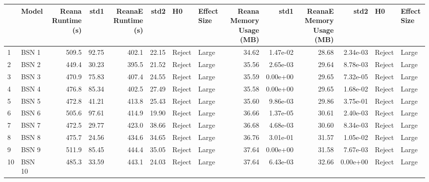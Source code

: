 \begin{tabular}{llrrrrllrrrrll}
\toprule
{} &   Model &  Reana Runtime (s) &    std1 &  ReanaE Runtime (s) &    std2 &          H0 & Effect Size &  Reana Memory Usage (MB) &      std1 &  ReanaE Memory Usage (MB) &      std2 &      H0 & Effect Size \\
\midrule
1  &   BSN 1 &              509.5 &   92.75 &               402.1 &   22.15 &      Reject &       Large &                    34.62 &  1.47e-02 &                     28.68 &  2.34e-03 &  Reject &       Large \\
2  &   BSN 2 &              449.4 &   30.23 &               395.5 &   21.52 &      Reject &       Large &                    35.56 &  2.65e-03 &                     29.64 &  8.78e-03 &  Reject &       Large \\
3  &   BSN 3 &              470.9 &   75.83 &               407.4 &   24.55 &      Reject &       Large &                    35.59 &  0.00e+00 &                     29.65 &  7.32e-05 &  Reject &       Large \\
4  &   BSN 4 &              476.8 &   85.34 &               402.5 &   27.49 &      Reject &       Large &                    35.58 &  0.00e+00 &                     29.65 &  1.68e-02 &  Reject &       Large \\
5  &   BSN 5 &              472.8 &   41.21 &               413.8 &   25.43 &      Reject &       Large &                    35.60 &  9.86e-03 &                     29.86 &  3.75e-01 &  Reject &       Large \\
6  &   BSN 6 &              505.6 &   97.61 &               414.9 &   19.90 &      Reject &       Large &                    36.66 &  1.37e-05 &                     30.61 &  2.40e-03 &  Reject &       Large \\
7  &   BSN 7 &              472.5 &   29.77 &               423.0 &   38.66 &      Reject &       Large &                    36.68 &  4.68e-03 &                     30.60 &  8.34e-03 &  Reject &       Large \\
8  &   BSN 8 &              475.7 &   24.56 &               434.6 &   34.65 &      Reject &       Large &                    36.76 &  3.01e-01 &                     31.57 &  1.05e-02 &  Reject &       Large \\
9  &   BSN 9 &              511.9 &   85.45 &               444.4 &   35.05 &      Reject &       Large &                    37.64 &  0.00e+00 &                     31.58 &  7.67e-03 &  Reject &       Large \\
10 &  BSN 10 &              485.3 &   33.59 &               443.1 &   24.03 &      Reject &       Large &                    37.64 &  6.43e-03 &                     32.66 &  0.00e+00 &  Reject &       Large \\

\end{tabular}
